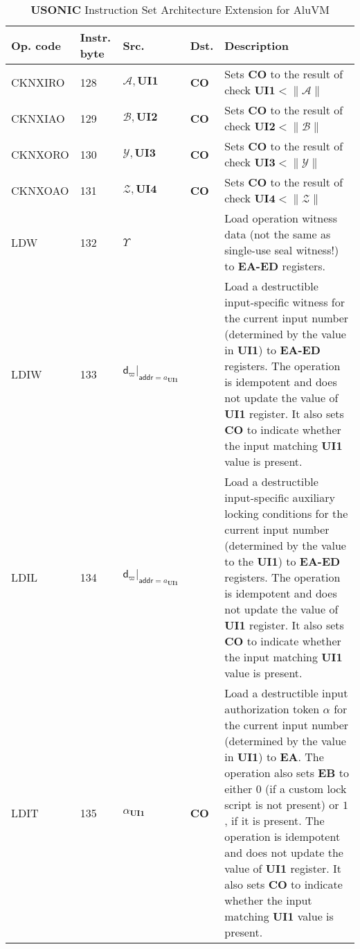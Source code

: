 \documentclass[9pt,oneside]{amsart}
\begin{document}
\begin{table}[h]
\centering
\caption{\textbf{USONIC} Instruction Set Architecture Extension for AluVM}\label{tab:usonic}
\begin{tabular}{l p{1cm} l p{1.5cm} p{9.3cm}}
\toprule
Op. code & Instr. byte & Src. & Dst. & Description \\
\midrule
CKNXIRO	&128	&$\mathcal{A}, \mathbf{UI1}$	&\textbf{CO}	&Sets \textbf{CO} to the result of check $\mathbf{UI1} < \| \mathcal{A} \|$ \\ \midrule
CKNXIAO	&129	&$\mathcal{B}, \mathbf{UI2}$	&\textbf{CO}	&Sets \textbf{CO} to the result of check $\mathbf{UI2} < \| \mathcal{B} \|$ \\ \midrule
CKNXORO	&130	&$\mathcal{Y}, \mathbf{UI3}$	&\textbf{CO}	&Sets \textbf{CO} to the result of check $\mathbf{UI3} < \| \mathcal{Y} \|$ \\ \midrule
CKNXOAO	&131	&$\mathcal{Z}, \mathbf{UI4}$	&\textbf{CO}	&Sets \textbf{CO} to the result of check $\mathbf{UI4} < \| \mathcal{Z} \|$ \\ \midrule
LDW	    &132	&$\Upsilon$	                    &              	&Load operation witness data (not the same as single-use seal witness!) to \textbf{EA-ED} registers. \\ \midrule
LDIW	&133	&$\mathsf{d}_\varpi|_{\mathsf{addr} = a_\mathbf{UI1}}$	&	&Load a destructible input-specific witness for the current input number (determined by the value in \textbf{UI1}) to \textbf{EA-ED} registers. 
The operation is idempotent and does not update the value of \textbf{UI1} register. It also sets \textbf{CO} to indicate whether the input matching \textbf{UI1} value is present. \\ \midrule
LDIL	&134	&$\mathsf{d}_\varpi|_{\mathsf{addr} = a_\mathbf{UI1}}$	&	&Load a destructible input-specific auxiliary locking conditions for the current input number (determined by the value to the \textbf{UI1}) to \textbf{EA-ED} registers. 
The operation is idempotent and does not update the value of \textbf{UI1} register. It also sets \textbf{CO} to indicate whether the input matching \textbf{UI1} value is present. \\ \midrule
LDIT	&135	&$\alpha_\mathbf{UI1}$	        &\textbf{CO}	&Load a destructible input authorization token $\alpha$ for the current input number (determined by the value in \textbf{UI1}) to \textbf{EA}. The operation also sets \textbf{EB} to either $0$ (if a custom lock script is not present) or $1$, if it is present.
The operation is idempotent and does not update the value of \textbf{UI1} register. It also sets \textbf{CO} to indicate whether the input matching \textbf{UI1} value is present. \\ \midrule

\end{tabular}
\end{table}
\end{document}
